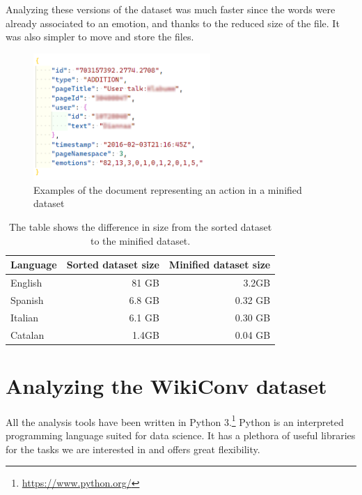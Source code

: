 Analyzing these versions of the dataset was much faster since the words were already associated to an emotion, and thanks to the reduced size of the file. It was also simpler to move and store the files.

\begin{figure}[H]
    \centering
    \includegraphics[width=0.6\textwidth]{./img/min.png}
    \caption{Examples of the document representing an action in a minified dataset}
    \label{fig:min}
\end{figure}


\begin{table}[H]
    \centering
    \begin{tabularx}{\columnwidth}{@{}Xrr@{}}
        \midrule
        \textbf{Language} & \textbf{Sorted dataset size} & \textbf{Minified dataset size} \\ \toprule
        English & 81 GB & 3.2GB  \\
        Spanish &  6.8 GB & 0.32 GB \\
        Italian &  6.1 GB & 0.30 GB \\
        Catalan &  1.4GB & 0.04 GB \\

         \bottomrule
    \end{tabularx}
    
    \caption{The table shows the difference in size from the sorted dataset to the minified dataset. \label{table:datasetsize}}
\end{table}


\section{Analyzing the WikiConv dataset}
\label{sec:analyzingthewikiconvdataset}
All the analysis tools have been written in Python 3.\footnote{\url{https://www.python.org/}} Python is an interpreted programming language suited for data science. It has a plethora of useful libraries for the tasks we are interested in and offers great flexibility.

